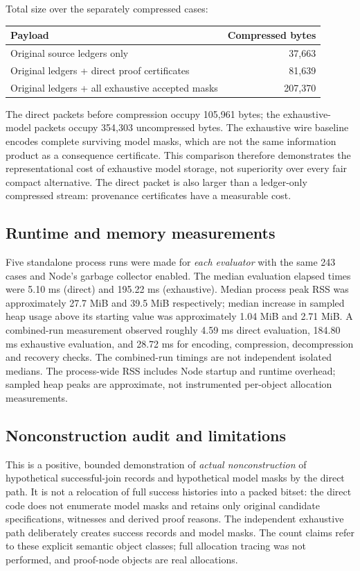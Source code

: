 \documentclass[11pt]{article}
\begin{document}
Total size over the separately compressed cases:
\begin{center}
\begin{tabular}{lr}
\hline
Payload & Compressed bytes\\
\hline
Original source ledgers only & 37,663\\
Original ledgers + direct proof certificates & 81,639\\
Original ledgers + all exhaustive accepted masks & 207,370\\
\hline
\end{tabular}
\end{center}
The direct packets before compression occupy
105,961 bytes; the exhaustive-model packets
occupy 354,303 uncompressed bytes. The exhaustive
wire baseline encodes complete surviving model
masks, which are not the same information product
as a consequence certificate. This comparison
therefore demonstrates the representational cost
of exhaustive model storage, not superiority over
every fair compact alternative. The direct packet
is also larger than a ledger-only compressed stream:
provenance certificates have a measurable cost.

\subsection{Runtime and memory measurements}
Five standalone process runs were made for
\emph{each evaluator} with the same 243 cases
and Node's garbage collector enabled. The
median evaluation elapsed times were 5.10 ms
(direct) and 195.22 ms (exhaustive).
Median process peak RSS was approximately
27.7 MiB and 39.5 MiB respectively; median
increase in sampled heap usage above its starting
value was approximately 1.04 MiB and 2.71 MiB.
A combined-run measurement observed roughly
4.59 ms direct evaluation, 184.80 ms exhaustive
evaluation, and 28.72 ms for encoding,
compression, decompression and recovery checks.
The combined-run timings are not independent
isolated medians. The process-wide RSS includes
Node startup and runtime overhead; sampled
heap peaks are approximate, not instrumented
per-object allocation measurements.

\subsection{Nonconstruction audit and limitations}
This is a positive, bounded demonstration of
\emph{actual nonconstruction} of hypothetical
successful-join records and hypothetical model
masks by the direct path. It is not a relocation
of full success histories into a packed bitset:
the direct code does not enumerate model masks
and retains only original candidate specifications,
witnesses and derived proof reasons. The
independent exhaustive path deliberately
creates success records and model masks.
The count claims refer to these explicit
semantic object classes; full allocation
tracing was not performed, and proof-node
objects are real allocations.
\end{document}
